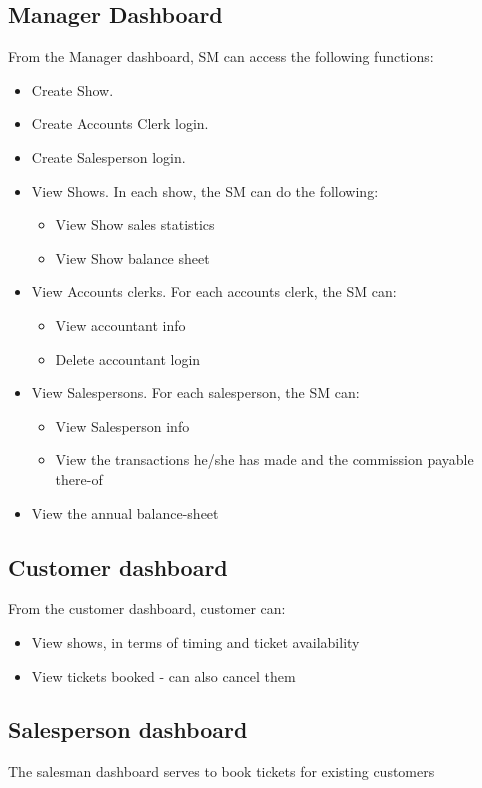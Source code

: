 \documentclass{scrreprt}
\begin{document}
\subsection{Manager Dashboard}
From the Manager dashboard, SM can access the following functions:
\begin{itemize}
\item Create Show.
\item Create Accounts Clerk login.
\item Create Salesperson login.
\item View Shows. In each show, the SM can do the following:
\begin{itemize}
\item View Show sales statistics
\item View Show balance sheet
\end{itemize}
\item View Accounts clerks. For each accounts clerk, the SM can:
\begin{itemize}
\item View accountant info
\item Delete accountant login
\end{itemize}
\item View Salespersons. For each salesperson, the SM can:
\begin{itemize}
\item View Salesperson info
\item View the transactions he/she has made and the commission payable there-of
\end{itemize}
\item View the annual balance-sheet
\end{itemize}

\subsection{Customer dashboard}
From the customer dashboard, customer can:
\begin{itemize}
\item View shows, in terms of timing and ticket availability
\item View tickets booked - can also cancel them
\end{itemize}

\subsection{Salesperson dashboard}
The salesman dashboard serves to book tickets for existing customers
\end{document}
